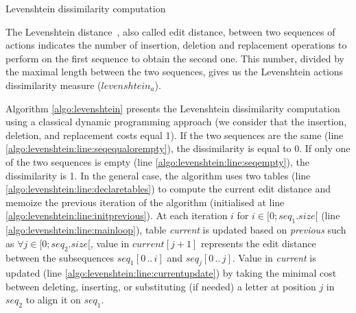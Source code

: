 \begin{algorithm}[t]
	\Begin{
		\If{$seq_1 == seq_2$ \nllabel{algo:levenshtein:line:seqequalorempty} }{
			\Return 0 \;
		}
		\If{$seq_1$ or $seq_2$ are empty \nllabel{algo:levenshtein:line:seqempty} }{
			\Return 1 \;
		}
		$int[seq_2.size + 1]$ $\wPrevious$; $int[seq_2.size + 1]$ $\wCurrent$\; \nllabel{algo:levenshtein:line:declaretables}
		\For{$i \in [0;seq_2.size + 1[$ \nllabel{algo:levenshtein:line:initprevious} }{$\wPrevious[i] = i$\;}
	  	\For{$i \in [0;seq_1.size[$ \nllabel{algo:levenshtein:line:mainloop}}{
	  		$\wCurrent[0] = (i + 1)$\;
	  		\For{$j \in [0;seq_2.size[$}{
	  			$int$ $\wCost = seq_1[i] == seq_2[j]$ $?$ $1 : 0$\;
	  			$\wCurrent[j + 1] = min(\wCurrent[j],$ $\wPrevious[j + 1],$ $\wPrevious[j] * \wCost)$\; \nllabel{algo:levenshtein:line:currentupdate}
	  		}
 			$\wCurrent = \wPrevious.\mathit{copy}()$ \;
	  	}	
  		\Return $\wCurrent[seq_2.size] / max(seq_1.size, seq_2.size)$\;
	}
	\caption{Levenshtein dissimilarity computation}
 \label{algo:levenshtein}
\end{algorithm}

The Levenshtein distance~\cite{Levenshtein1966}, also called edit distance, between two sequences of actions indicates the number of insertion, deletion and replacement operations to perform on the first sequence to obtain the second one. This number, divided by the maximal length between the two sequences, gives us the Levenshtein actions dissimilarity measure ($levenshtein_a$). 

Algorithm \ref{algo:levenshtein} presents the Levenshtein dissimilarity computation using a classical dynamic programming approach (we consider that the insertion, deletion, and replacement costs equal 1). If the two sequences are the same (line \ref{algo:levenshtein:line:seqequalorempty}), the dissimilarity is equal to 0. If only one of the two sequences is empty (line \ref{algo:levenshtein:line:seqempty}), the dissimilarity is 1. In the general case, the algorithm uses two tables (line \ref{algo:levenshtein:line:declaretables}) to compute the current edit distance and memoize the previous iteration of the algorithm (initialised at line \ref{algo:levenshtein:line:initprevious}). At each iteration $i$ for $i \in [0;seq_1.size[$ (line \ref{algo:levenshtein:line:mainloop}), table \textit{current} is updated based on \textit{previous} such as $\forall j \in [0;seq_2.size[$, value in $current[j+1]$  represents the edit distance between the subsequences $seq_1[0\,..\,i]$ and $seq_j[0\,..\,j]$. Value in \textit{current} is updated (line \ref{algo:levenshtein:line:currentupdate}) by taking the minimal cost between deleting, inserting, or substituting (if needed) a letter at position $j$ in $seq_2$ to align it on $seq_1$.


